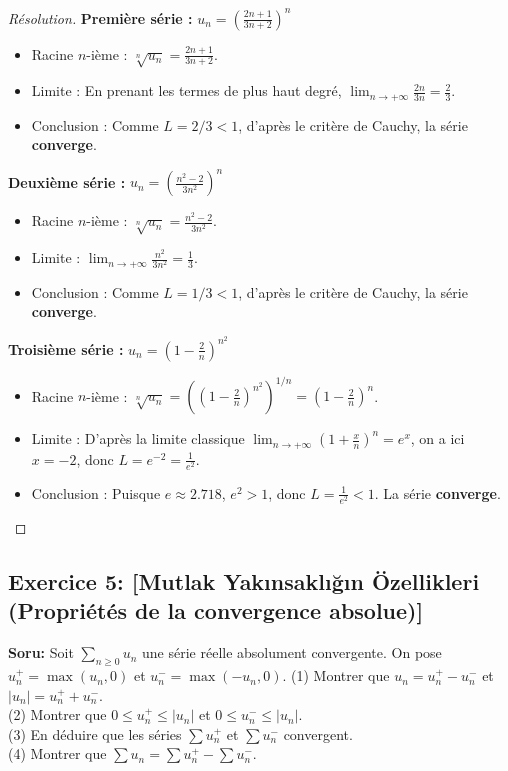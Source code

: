 \documentclass[12pt,a4paper]{report}
\begin{document}
\begin{proof}[Résolution]
\textbf{Première série :} $u_n = \left( \frac{2n+1}{3n+2} \right)^n$
\begin{itemize}
    \item Racine $n$-ième : $\sqrt[n]{u_n} = \frac{2n+1}{3n+2}$.
    \item Limite : En prenant les termes de plus haut degré, $\lim_{n \to +\infty} \frac{2n}{3n} = \frac{2}{3}$.
    \item Conclusion : Comme $L = 2/3 < 1$, d'après le critère de Cauchy, la série \textbf{converge}.
\end{itemize}

\textbf{Deuxième série :} $u_n = \left( \frac{n^2-2}{3n^2} \right)^n$
\begin{itemize}
    \item Racine $n$-ième : $\sqrt[n]{u_n} = \frac{n^2-2}{3n^2}$.
    \item Limite : $\lim_{n \to +\infty} \frac{n^2}{3n^2} = \frac{1}{3}$.
    \item Conclusion : Comme $L = 1/3 < 1$, d'après le critère de Cauchy, la série \textbf{converge}.
\end{itemize}

\textbf{Troisième série :} $u_n = \left( 1 - \frac{2}{n} \right)^{n^2}$
\begin{itemize}
    \item Racine $n$-ième : $\sqrt[n]{u_n} = \left( \left( 1 - \frac{2}{n} \right)^{n^2} \right)^{1/n} = \left( 1 - \frac{2}{n} \right)^n$.
    \item Limite : D'après la limite classique $\lim_{n \to +\infty} \left(1 + \frac{x}{n}\right)^n = e^x$, on a ici $x = -2$, donc $L = e^{-2} = \frac{1}{e^2}$.
    \item Conclusion : Puisque $e \approx 2.718$, $e^2 > 1$, donc $L = \frac{1}{e^2} < 1$. La série \textbf{converge}.
\end{itemize}
\end{proof}

\subsection*{Exercice 5: [Mutlak Yakınsaklığın Özellikleri (Propriétés de la convergence absolue)]}

\textbf{Soru:}
Soit $\sum_{n \ge 0} u_n$ une série réelle absolument convergente. On pose $u_n^+ = \max(u_n, 0)$ et $u_n^- = \max(-u_n, 0)$.
(1) Montrer que $u_n = u_n^+ - u_n^-$ et $|u_n| = u_n^+ + u_n^-$.\\
(2) Montrer que $0 \le u_n^+ \le |u_n|$ et $0 \le u_n^- \le |u_n|$.\\
(3) En déduire que les séries $\sum u_n^+$ et $\sum u_n^-$ convergent.\\
(4) Montrer que $\sum u_n = \sum u_n^+ - \sum u_n^-$.
\end{document}
